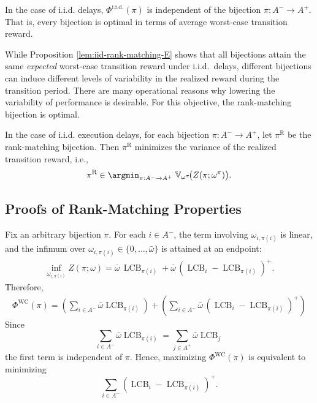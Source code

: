 \documentclass[opre,blindrev]{informs3}
\newcommand{\LCB}{\operatorname{LCB}}
\begin{document}
\begin{APPENDICES}
\begin{proposition}
\label{lem:iid-rank-matching-E}
In the case of i.i.d. delays, \(\Phi^{\mathrm{i.i.d.}}(\pi)\) is independent of the bijection \(\pi:A^-\to A^+\). That is, every bijection is optimal in terms of average worst-case transition reward.
\end{proposition}

While Proposition \ref{lem:iid-rank-matching-E} shows that all bijections attain the same \emph{expected} worst-case transition reward under i.i.d.\ delays, different bijections can induce different levels of variability in the realized reward during the transition period. There are many operational reasons why lowering the variability of performance is desirable. For this objective, the rank-matching bijection is optimal.

\begin{proposition}\label{lem:iid-rank-matching-Var} 
In the case of i.i.d. execution delays, for each bijection \(\pi:A^-\to A^+\), let \(\pi^{\mathrm{R}}\) be the rank-matching bijection. Then \(\pi^{\mathrm{R}}\) minimizes the variance of the realized transition reward, i.e., 
    \[
    \pi^{\mathrm{R}} \in \argmin_{\pi:A^-\to A^+}\; \mathbb{V}_{\omega^{\pi}}\!\bigl(Z(\pi;\omega^{\pi})\bigr).
    \]
\end{proposition}

\subsection{Proofs of Rank-Matching Properties}

    Fix an arbitrary bijection \(\pi\). For each \(i\in A^-\), the term involving \(\omega_{i,\pi(i)}\) is linear, and the infimum over \(\omega_{i,\pi(i)}\in\{0,\dots,\bar{\omega}\}\) is attained at an endpoint:
    \begin{eqnarray*}
    \inf_{\omega_{i,\pi(i)}}Z(\pi;\omega )=
       \bar{\omega}\,\LCB_{\pi(i)} + \bar{\omega}\,(\LCB_i-\LCB_{\pi(i)})^+.
    \end{eqnarray*}
    Therefore, 
   \begin{eqnarray*}
        \Phi^{\mathrm{WC}}(\pi)= \left(\sum_{i\in A^-}\bar{\omega}\LCB_{\pi(i)}\right)+ \left(\sum_{i\in A^-}\bar{\omega}\,(\LCB_i-\LCB_{\pi(i)})^+\right)
    \end{eqnarray*}
    Since
    \[\sum_{i\in A^-}\bar{\omega}\LCB_{\pi(i)}=\sum_{j\in A^+}\bar{\omega}\LCB_j\]
    the first term is independent of \(\pi\). Hence, maximizing \(\Phi^{\mathrm{WC}}(\pi)\) is equivalent to minimizing
    \[
        \sum_{i\in A^-} (\LCB_i-\LCB_{\pi(i)})^+.
    \]
    

\end{APPENDICES}
\end{document}
